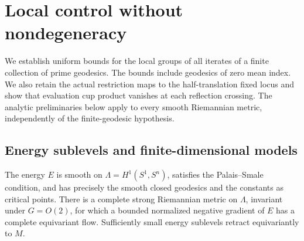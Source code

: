 \section{Local control without nondegeneracy}
\label{sec:local}

We establish uniform bounds for the local groups of all iterates of a
finite collection of prime geodesics.  The bounds include geodesics of
zero mean index.  We also retain the actual restriction maps to the
half-translation fixed locus and show that evaluation cup product
vanishes at each reflection crossing.  The analytic preliminaries below
apply to every smooth Riemannian metric, independently of the
finite-geodesic hypothesis.

\subsection{Energy sublevels and finite-dimensional models}

\begin{lemma}\label{lem:local-analytic}
The energy \(E\) is smooth on \(\Lambda=H^1(S^1,S^n)\), satisfies the
Palais--Smale condition, and has precisely the smooth closed geodesics
and the constants as critical points.  There is a complete strong
Riemannian metric on \(\Lambda\), invariant under \(G=O(2)\), for which
a bounded normalized negative gradient of \(E\) has a complete
equivariant flow.  Sufficiently small energy sublevels retract
equivariantly to \(M\).
\end{lemma}

